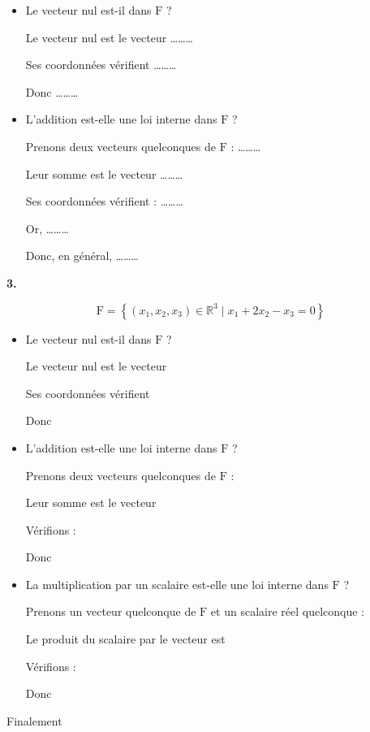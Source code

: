     \begin{itemize}[label=$\bullet$, itemsep=1em]
        \item Le vecteur nul est-il dans $\mathrm{F}$ ? 

    Le vecteur nul est le vecteur \dots\dots\dots 

    Ses coordonnées vérifient \dots\dots\dots 

    Donc \dots\dots\dots 

    \item L'addition est-elle une loi interne dans $\mathrm{F}$ ? 

    Prenons deux vecteurs quelconques de $\mathrm{F}$ : \dots\dots\dots 

    Leur somme est le vecteur \dots\dots\dots 

    Ses coordonnées vérifient : \dots\dots\dots 

    Or, \dots\dots\dots 

    Donc, en général, \dots\dots\dots 
\end{itemize}

\textbf{3.}

$$
\mathrm{F} = \left\{ (x_1, x_2, x_3) \in \mathbb{R}^3 \mid x_1 + 2x_2 - x_3 = 0 \right\}
$$

\begin{itemize}[label=$\bullet$, itemsep=1em]
    \item Le vecteur nul est-il dans $\mathrm{F}$ ?

    Le vecteur nul est le vecteur \dotfill

    Ses coordonnées vérifient \dotfill

    Donc \dotfill

    \item L'addition est-elle une loi interne dans $\mathrm{F}$ ?

    Prenons deux vecteurs quelconques de $\mathrm{F}$ : \dotfill

    Leur somme est le vecteur \dotfill

    Vérifions : \dotfill

    Donc \dotfill

    \item La multiplication par un scalaire est-elle une loi interne dans $\mathrm{F}$ ?

    Prenons un vecteur quelconque de $\mathrm{F}$ et un scalaire réel quelconque : \dotfill

    Le produit du scalaire par le vecteur est \dotfill

    Vérifions : \dotfill

    Donc \dotfill
\end{itemize}

Finalement \dotfill

\vspace{1em}


